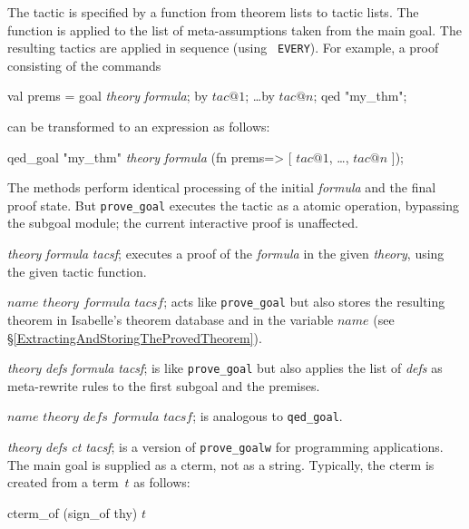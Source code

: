 The tactic is specified by a function from theorem lists to tactic lists.
The function is applied to the list of meta-assumptions taken from
the main goal.  The resulting tactics are applied in sequence (using {\tt
  EVERY}).  For example, a proof consisting of the commands
\begin{ttbox} 
val prems = goal {\it theory} {\it formula};
by \(tac@1\);  \ldots  by \(tac@n\);
qed "my_thm";
\end{ttbox}
can be transformed to an expression as follows:
\begin{ttbox} 
qed_goal "my_thm" {\it theory} {\it formula}
 (fn prems=> [ \(tac@1\), \ldots, \(tac@n\) ]);
\end{ttbox}
The methods perform identical processing of the initial {\it formula} and
the final proof state.  But {\tt prove_goal} executes the tactic as a
atomic operation, bypassing the subgoal module; the current interactive
proof is unaffected.
%
\begin{ttdescription}
\item[\ttindexbold{prove_goal} {\it theory} {\it formula} {\it tacsf};] 
executes a proof of the {\it formula\/} in the given {\it theory}, using
the given tactic function.

\item[\ttindexbold{qed_goal} $name$ $theory$ $formula$ $tacsf$;]
acts like {\tt prove_goal} but also stores the resulting theorem in
Isabelle's theorem database and in the {\ML} variable $name$ (see
\S\ref{ExtractingAndStoringTheProvedTheorem}).

\item[\ttindexbold{prove_goalw} {\it theory} {\it defs} {\it formula} 
      {\it tacsf};]
is like {\tt prove_goal} but also applies the list of {\it defs\/} as
meta-rewrite rules to the first subgoal and the premises.

\item[\ttindexbold{qed_goalw} $name$ $theory$ $defs$ $formula$ $tacsf$;]
is analogous to {\tt qed_goal}.

\item[\ttindexbold{prove_goalw_cterm} {\it theory} {\it defs} {\it ct}
      {\it tacsf};] 
is a version of {\tt prove_goalw} for programming applications.  The main
goal is supplied as a cterm, not as a string.  Typically, the cterm is
created from a term~$t$ as follows:
\begin{ttbox}
cterm_of (sign_of thy) \(t\)
\end{ttbox}
\end{ttdescription}


